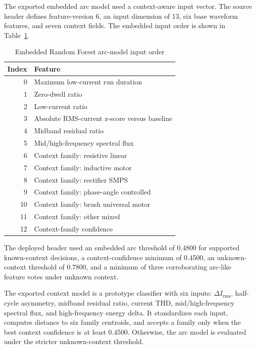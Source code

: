 The exported embedded arc model used a context-aware input vector. The source
header defines feature-version 6, an input dimension of 13, six base waveform
features, and seven context fields. The embedded input order is shown in
Table~\ref{tab:app-f-embedded-input-order}.
\begin{table}[H]
  \centering
  \caption{Embedded Random Forest arc-model input order}
  \label{tab:app-f-embedded-input-order}
  \begin{tabular}{rl}
    \toprule
    \textbf{Index} & \textbf{Feature} \\
    \midrule
    0 & Maximum low-current run duration \\
    1 & Zero-dwell ratio \\
    2 & Low-current ratio \\
    3 & Absolute RMS-current z-score versus baseline \\
    4 & Midband residual ratio \\
    5 & Mid/high-frequency spectral flux \\
    6 & Context family: resistive linear \\
    7 & Context family: inductive motor \\
    8 & Context family: rectifier SMPS \\
    9 & Context family: phase-angle controlled \\
    10 & Context family: brush universal motor \\
    11 & Context family: other mixed \\
    12 & Context-family confidence \\
    \bottomrule
  \end{tabular}
\end{table}

The deployed header used an embedded arc threshold of 0.4800 for supported
known-context decisions, a context-confidence minimum of 0.4500, an
unknown-context threshold of 0.7800, and a minimum of three corroborating
arc-like feature votes under unknown context.

The exported context model is a prototype classifier with six inputs:
$\Delta I_{\mathrm{rms}}$, half-cycle asymmetry, midband residual ratio,
current THD, mid/high-frequency spectral flux, and high-frequency energy
delta. It standardizes each input, computes distance to six family centroids,
and accepts a family only when the best context confidence is at least 0.4500.
Otherwise, the arc model is evaluated under the stricter unknown-context
threshold.
